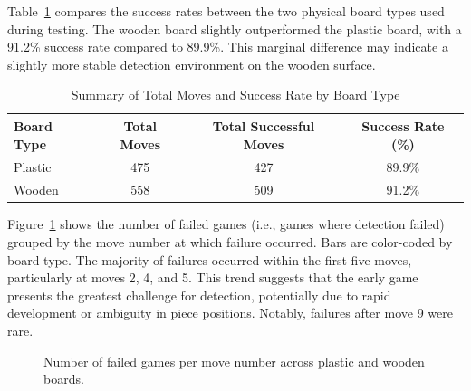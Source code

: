 Table~\ref{tab:board-type-accuracy} compares the success rates between the two physical board types used during testing. The wooden board slightly outperformed the plastic board, with a 91.2\% success rate compared to 89.9\%. This marginal difference may indicate a slightly more stable detection environment on the wooden surface. \\


\begin{table}[htbp]
\centering
\caption{Summary of Total Moves and Success Rate by Board Type}
\label{tab:board-type-accuracy}
\begin{tabular}{lccc}
\toprule
\textbf{Board Type} & \textbf{Total Moves} & \textbf{Total Successful Moves} & \textbf{Success Rate (\%)} \\
\midrule
Plastic & 475 & 427 & 89.9\% \\
Wooden  & 558 & 509 & 91.2\% \\
\bottomrule
\end{tabular}
\end{table}


Figure~\ref{fig:move-failures} shows the number of failed games (i.e., games where detection failed) grouped by the move number at which failure occurred. Bars are color-coded by board type. The majority of failures occurred within the first five moves, particularly at moves 2, 4, and 5. This trend suggests that the early game presents the greatest challenge for detection, potentially due to rapid development or ambiguity in piece positions. Notably, failures after move 9 were rare. \\


\begin{figure}[htbp]
\centering
{}
\caption{Number of failed games per move number across plastic and wooden boards.}
\label{fig:move-failures}
\end{figure}


